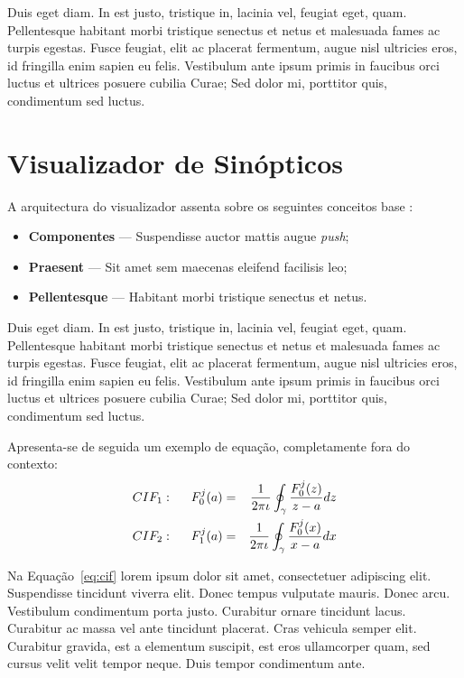 \documentclass[twocolumn,twoside,10pt,a4paper]{article}
\begin{document}
Duis eget diam. In est justo, tristique in, lacinia vel, feugiat eget,
quam. Pellentesque habitant morbi tristique senectus et netus et
malesuada fames ac turpis egestas. Fusce feugiat, elit ac placerat
fermentum, augue nisl ultricies eros, id fringilla enim sapien eu
felis. Vestibulum ante ipsum primis in faucibus orci luctus et
ultrices posuere cubilia Curae; Sed dolor mi, porttitor quis,
condimentum sed luctus. 

\section{Visualizador de Sinópticos}\label{sec:application}

A arquitectura do visualizador assenta sobre os seguintes conceitos base \cite{kn:zpmd}:
\begin{itemize}
\item \textbf{Componentes} --- Suspendisse auctor mattis augue \emph{push};
\item \textbf{Praesent} --- Sit amet sem maecenas eleifend facilisis leo;
\item \textbf{Pellentesque} --- Habitant morbi tristique senectus et netus.
\end{itemize}

Duis eget diam. In est justo, tristique in, lacinia vel, feugiat eget,
quam. Pellentesque habitant morbi tristique senectus et netus et
malesuada fames ac turpis egestas. Fusce feugiat, elit ac placerat
fermentum, augue nisl ultricies eros, id fringilla enim sapien eu
felis. Vestibulum ante ipsum primis in faucibus orci luctus et
ultrices posuere cubilia Curae; Sed dolor mi, porttitor quis,
condimentum sed luctus. 

Apresenta-se de seguida um exemplo de equação, completamente fora do contexto:
\begin{eqnarray}
CIF_1: \hspace*{5mm}F_0^j(a) &=& \frac{1}{2\pi \iota} \oint_{\gamma} \frac{F_0^j(z)}{z - a} dz\\
CIF_2: \hspace*{5mm}F_1^j(a) &=& \frac{1}{2\pi \iota} \oint_{\gamma} \frac{F_0^j(x)}{x - a} dx \label{eq:cif}
\end{eqnarray}

Na Equação~\ref{eq:cif} lorem ipsum dolor sit amet, consectetuer
adipiscing elit. Suspendisse tincidunt viverra elit. Donec tempus
vulputate mauris. Donec arcu. Vestibulum condimentum porta
justo. Curabitur ornare tincidunt lacus. Curabitur ac massa vel ante
tincidunt placerat. Cras vehicula semper elit. Curabitur gravida, est
a elementum suscipit, est eros ullamcorper quam, sed cursus velit
velit tempor neque. Duis tempor condimentum ante.
\end{document}
